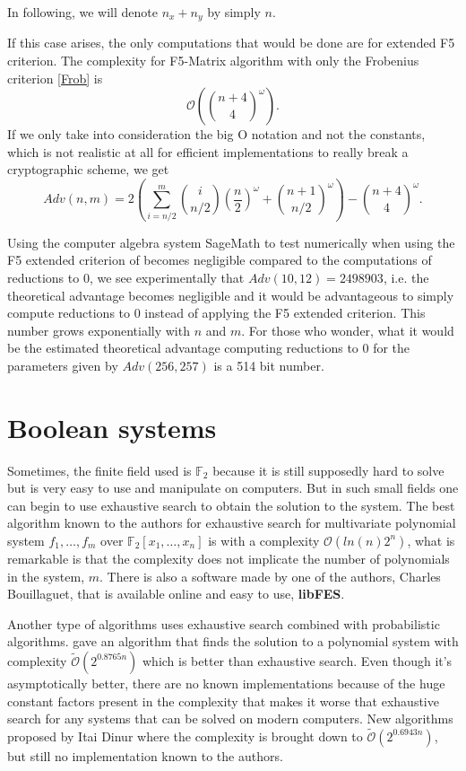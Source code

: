 \documentclass[english]{article}
\begin{document}
		 In following, we will denote $n_x + n_y$ by simply $n$.
		 
		 If this case arises, the only computations that would be done are for extended F5 criterion. The complexity for F5-Matrix algorithm with only the Frobenius criterion \ref{Frob} is 
		 $$
		 \mathcal{O}\left(\binom{n + 4}{4}^\omega\right).
		 $$
		 If we only take into consideration the big O notation and not the constants, which is not realistic at all for efficient implementations to really break a cryptographic scheme, we get
		 \begin{equation}
		 Adv(n, m) = 2\left(\sum_{i = n/2}^{m}\binom{i}{n/2}\left(\frac{n}{2}\right)^\omega + \binom{n + 1}{n/2}^\omega\right) - \binom{n + 4}{4}^\omega.
		 \label{equation_complex}
		 \end{equation}
		 
		 Using the computer algebra system SageMath \cite{sagemath} to test numerically when using the F5 extended criterion of \cite{FSS11} becomes negligible compared to the computations of reductions to 0, we see experimentally that $Adv(10, 12) = 2498903$, i.e. the theoretical advantage becomes negligible and it would be advantageous to simply compute reductions to 0 instead of applying the F5 extended criterion. This number grows exponentially with $n$ and $m$. For those who wonder, what it would be the estimated theoretical advantage computing reductions to 0 for the parameters given by \cite{HJ23} $Adv(256, 257)$ is a 514 bit number.
		 
	\section{Boolean systems}
		Sometimes, the finite field used is $\mathbb{F}_2$ because it is still supposedly hard to solve but is very easy to use and manipulate on computers. But in such small fields one can begin to use exhaustive search to obtain the solution to the system. The best algorithm known to the authors for exhaustive search for multivariate polynomial system $f_1,\dots,f_m$ over $\mathbb{F}_2[x_1,\dots,x_n]$ is \cite{BCC+10} with a complexity $\mathcal{O}(ln(n)2^n)$, what is remarkable is that the complexity does not implicate the number of polynomials in the system, $m$. There is also a software made by one of the authors, Charles Bouillaguet, that is available online and easy to use, \textbf{libFES}.
		
		Another type of algorithms uses exhaustive search combined with probabilistic algorithms. \cite{LPT+17} gave an algorithm that finds the solution to a polynomial system with complexity $\tilde{\mathcal{O}}(2^{0.8765n})$ which is better than exhaustive search. Even though it's asymptotically better, there are no known implementations because of the huge constant factors present in the complexity that makes it worse that exhaustive search for any systems that can be solved on modern computers. New algorithms proposed by Itai Dinur \cite{Itai21A, Itai21B} where the complexity is brought down to $\tilde{\mathcal{O}}(2^{0.6943n})$, but still no implementation known to the authors.
		
\end{document}
